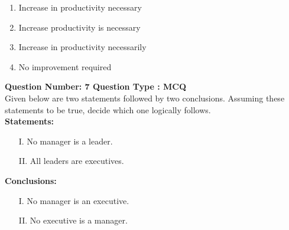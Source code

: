 \begin{enumerate}
    \item Increase in productivity necessary
    \item Increase productivity is necessary
    \item Increase in productivity necessarily
    \item No improvement required
\end{enumerate}
\bigskip
\item \textbf{Question Number: 7 Question Type : MCQ}\\
Given below are two statements followed by two conclusions. Assuming these statements to be true, decide which one logically follows. \\

\textbf{Statements:}
\begin{enumerate}
    \item[I.] No manager is a leader.
    \item[II.] All leaders are executives.
\end{enumerate}

\textbf{Conclusions:}
\begin{enumerate}
    \item[I.] No manager is an executive.
    \item[II.] No executive is a manager.
\end{enumerate}

